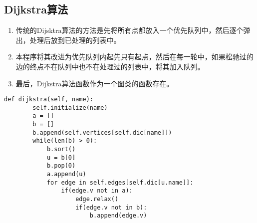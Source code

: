 \documentclass[12pt,letterpaper]{article}
\begin{document}
\subsection{Dijkstra算法}
\begin{enumerate}
	\item 传统的Dijsktra算法的方法是先将所有点都放入一个优先队列中，然后逐个弹出，处理后放到已处理的列表中。
	\item 本程序将其改进为优先队列内起先只有起点，然后在每一轮中，如果松驰过的边的终点不在队列中也不在处理过的列表中，将其加入队列。
	\item 最后，Dijkstra算法函数作为一个图类的函数存在。
\end{enumerate}
\begin{lstlisting}[style = Python]
    def dijkstra(self, name):
        self.initialize(name)
        a = []
        b = []
        b.append(self.vertices[self.dic[name]])
        while(len(b) > 0):
            b.sort()
            u = b[0]
            b.pop(0)
            a.append(u)
            for edge in self.edges[self.dic[u.name]]:
                if(edge.v not in a):
                    edge.relax()
                    if(edge.v not in b):
                        b.append(edge.v)   
\end{lstlisting}
\end{document}
